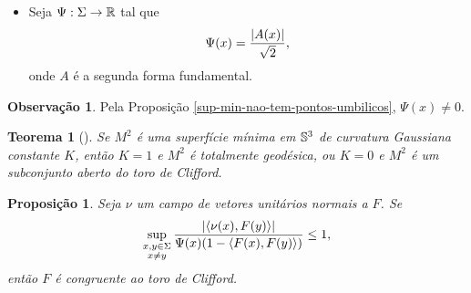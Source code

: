 \documentclass[10pt,a4paper]{beamer}
\newtheorem{teorema}{Teorema}
\newtheorem{proposicao}{Proposição}
\theoremstyle{definition}
\newtheorem{definicao}{Definição}
\newtheorem{observacao}{Observação}
\begin{document}
\begin{frame}

	\begin{itemize}
		\item Seja $\Psi: \Sigma \rightarrow \mathbb R$ tal que
		\begin{equation*}
		\Psi(x) = \frac{\left| A(x) \right|}{\sqrt{2}},
		\end{equation*}
		onde $A$ é a segunda forma fundamental.
	\end{itemize}
	
	\pause
	
	\begin{observacao}
		Pela Proposição \ref{sup-min-nao-tem-pontos-umbilicos}, $\Psi(x) \neq 0$.
	\end{observacao}

	\pause


\end{frame}

\begin{frame}

	\begin{teorema}[\cite{Lawson1969}]
		\label{curv-gauss-de-sup-min-em-S3}
		Se $M^2$ é uma superfície mínima em $\mathbb{S}^3$ de curvatura Gaussiana constante $K$, então $K=1$ e $M^2$ é totalmente geodésica, ou $K=0$ e $M^2$ é um subconjunto aberto do toro de Clifford.
	\end{teorema}

	\pause

	\begin{proposicao}\label{aleph-leq-1}
		Seja $\nu$ um campo de vetores unitários normais a $F$.
		Se
		\begin{equation*}
		\sup_{\substack{x,y \in \Sigma \\ x \neq y}} \frac{\left| \left\langle \nu(x),F(y) \right\rangle \right|}{\Psi(x) (1-\left\langle F(x),F(y) \right\rangle)} \leq 1,
		\end{equation*}
		então $F$ é congruente ao toro de Clifford.
	\end{proposicao}

\end{frame}
\end{document}

